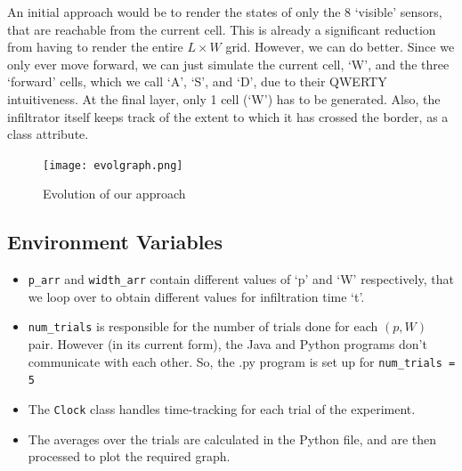 \documentclass{article}
\let\oldtexttt\texttt
\renewcommand{\texttt}[1]{
  \colorbox{bgcolor}{\oldtexttt{#1}}
  }
\begin{document}
An initial approach would be to render the states of only the 8 `visible' sensors, that are reachable from the current cell. This is already a significant reduction from having to render the entire $L \times W$ grid. However, we can do better. Since we only ever move forward, we can just simulate the current cell, `W', and the three `forward' cells, which we call `A', `S', and `D', due to their QWERTY intuitiveness. At the final layer, only 1 cell (`W') has to be generated. Also, the infiltrator itself keeps track of the extent to which it has crossed the border, as a class attribute.

\begin{figure}[hbt]
    \centering
    \texttt{[image: evolgraph.png]}
    \caption{Evolution of our approach}
    \label{fig:evolve}
\end{figure}

\subsection{Environment Variables}

\begin{itemize}
    \item \texttt{p\_arr} and \texttt{width\_arr} contain different values of `p' and `W' respectively, that we loop over to obtain different values for infiltration time `t'.
    \item \texttt{num\_trials} is responsible for the number of trials done for each $(p,W)$ pair. However (in its current form), the Java and Python programs don't communicate with each other. So, the .py program is set up for \texttt{num\_trials = 5}
    \item The \texttt{Clock} class handles time-tracking for each trial of the experiment. 
    \item The averages over the trials are calculated in the Python file, and are then processed to plot the required graph.
\end{itemize}
\end{document}
